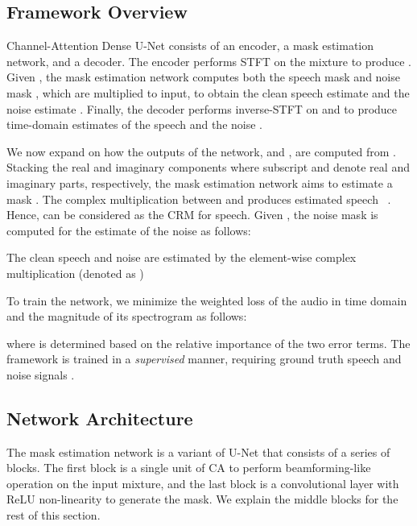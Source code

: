 \documentclass{article}
\begin{document}
\subsection{Framework Overview}
\label{sec:arc}
Channel-Attention Dense U-Net consists of an encoder, a mask estimation network, and a decoder. The encoder performs STFT on the mixture  to produce . Given , the mask estimation network computes both the speech mask  and noise mask , which are multiplied to input, to obtain the clean speech estimate  and the noise estimate . Finally, the decoder performs inverse-STFT on  and  to produce time-domain estimates of the speech  and the noise .





We now expand on how the outputs of the network,  and , are computed from . Stacking the real and imaginary components  where subscript  and  denote real and imaginary parts, respectively, the mask estimation network aims to estimate a mask . The complex multiplication between  and  produces estimated speech ~\cite{TFmask, maskchak}. Hence,  can be considered as the CRM for speech. Given , the noise mask  is computed for the estimate of the noise  as follows:

The clean speech  and noise  are estimated by the element-wise complex multiplication (denoted as )


To train the network, we minimize the weighted  loss of the audio in time domain and the magnitude of its spectrogram as follows:

where  is determined based on the relative importance of the two error terms. The framework is trained in a \textit{supervised} manner, requiring ground truth speech and noise signals \cite{wang2018supervised}.
\vspace{-1mm}
\subsection{Network Architecture}

The mask estimation network is a variant of U-Net that consists of a series of blocks. The first block is a single unit of CA to perform beamforming-like operation on the input mixture, and the last block is a convolutional layer with ReLU non-linearity to generate the mask. We explain the middle blocks for the rest of this section.
\end{document}
